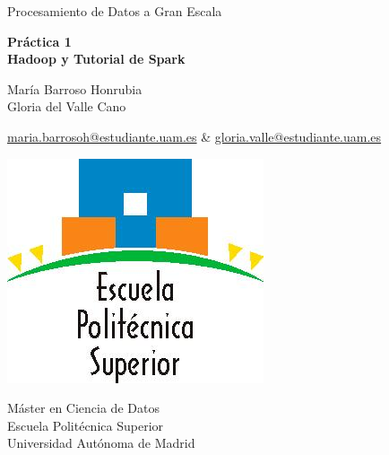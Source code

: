 \documentclass[10pt,swedish, openany]{book}
\begin{document}

\begin{titlepage}
	\clearpage\thispagestyle{empty}
	\centering
	\vspace{2cm}

	{\large Procesamiento de Datos a Gran Escala \par}
	\vspace{4cm}
	{\Huge \textbf{Práctica 1}} \\
	\vspace{1cm}
	{\large \textbf{Hadoop y Tutorial de Spark} \\} %
	\vspace{4cm}
	{\normalsize María Barroso Honrubia \\ %
	             Gloria del Valle Cano \par}
	              \href{mailto:maria.barrosoh@estudiante.uam.es}{maria.barrosoh@estudiante.uam.es} \&
	              \href{mailto:gloria.valle@estudiante.uam.es}{gloria.valle@estudiante.uam.es} \\
	\vspace{2cm}

    \includegraphics[scale=0.28]{logoEPSofi.jpg}
    
    \vspace{1.7cm}
    
	{\normalsize Máster en Ciencia de Datos \\ 
		Escuela Politécnica Superior \\
		Universidad Autónoma de Madrid \par}
		
	\date{today}
	\vspace{2cm}
	
	\pagebreak

\end{titlepage}
\end{document}
